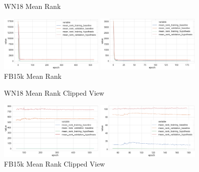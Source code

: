 \begin{figure}[H]
	\parbox{.5\linewidth}{
   		\caption{WN18 Mean Rank}
   		\centering
    		\includegraphics[width=0.45\textwidth, height=0.2\textheight]{WN18_mean_rank_Results}
		}
	\hfill
	\parbox{.5\linewidth}{
		\caption{FB15k Mean Rank}
   		\centering
		\includegraphics[width=0.45\textwidth, height=0.2\textheight]{FB15k_mean_rank_Results}
		}
\end{figure}

\begin{figure}[H]
	\parbox{.5\linewidth}{
   		\caption{WN18 Mean Rank Clipped View}
   		\centering
    		\includegraphics[width=0.45\textwidth, height=0.2\textheight]{WN18_mean_rank_Results_Clipped}
		}
	\hfill
	\parbox{.5\linewidth}{
		\caption{FB15k Mean Rank Clipped View}
   		\centering
		\includegraphics[width=0.45\textwidth, height=0.2\textheight]{FB15k_mean_rank_Results_Clipped}
		}
\end{figure}


